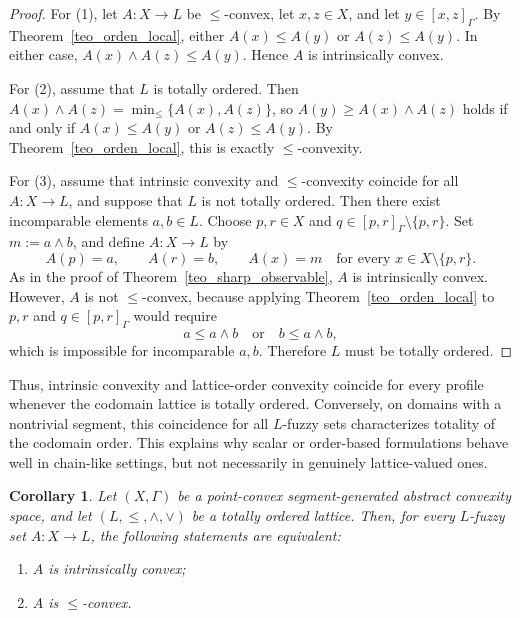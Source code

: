 \documentclass[11pt,a4paper]{article}
\newtheorem{corollary}{Corollary}
\begin{document}
\begin{proof}
For (1), let \(A:X\to L\) be \(\leq\)-convex, let \(x,z\in X\), and let \(y\in[x,z]_{\Gamma}\). By Theorem~\ref{teo_orden_local}, either \(A(x)\le A(y)\) or \(A(z)\le A(y)\). In either case, \(A(x)\wedge A(z)\le A(y)\). Hence \(A\) is intrinsically convex.

For (2), assume that \(L\) is totally ordered. Then \(A(x)\wedge A(z)=\min_{\le}\{A(x),A(z)\}\), so \(A(y)\ge A(x)\wedge A(z)\) holds if and only if \(A(x)\le A(y)\) or \(A(z)\le A(y)\). By Theorem~\ref{teo_orden_local}, this is exactly \(\leq\)-convexity.

For (3), assume that intrinsic convexity and \(\leq\)-convexity coincide for all \(A:X\to L\), and suppose that \(L\) is not totally ordered. Then there exist incomparable elements \(a,b\in L\). Choose \(p,r\in X\) and \(q\in[p,r]_{\Gamma}\setminus\{p,r\}\). Set \(m:=a\wedge b\), and define \(A:X\to L\) by
\begin{equation*}
A(p)=a,\qquad A(r)=b,\qquad A(x)=m\quad\text{for every }x\in X\setminus\{p,r\}.
\end{equation*}
As in the proof of Theorem~\ref{teo_sharp_observable}, \(A\) is intrinsically convex. However, \(A\) is not \(\leq\)-convex, because applying Theorem~\ref{teo_orden_local} to \(p,r\) and \(q\in[p,r]_{\Gamma}\) would require
\begin{equation*}
a\le a\wedge b
\quad\text{or}\quad
b\le a\wedge b,
\end{equation*}
which is impossible for incomparable \(a,b\). Therefore \(L\) must be totally ordered.
\end{proof}

Thus, intrinsic convexity and lattice-order convexity coincide for every profile whenever the codomain lattice is totally ordered. Conversely, on domains with a nontrivial segment, this coincidence for all \(L\)-fuzzy sets characterizes totality of the codomain order. This explains why scalar or order-based formulations behave well in chain-like settings, but not necessarily in genuinely lattice-valued ones.

\begin{corollary}\label{cororlario_lattice_order_total}
Let \((X,\Gamma)\) be a point-convex segment-generated abstract convexity space, and let \((L,\leq,\wedge,\vee)\) be a totally ordered lattice. Then, for every \(L\)-fuzzy set \(A:X\to L\), the following statements are equivalent:
\begin{enumerate}
    \item \(A\) is intrinsically convex;
    \item \(A\) is \(\leq\)-convex.
\end{enumerate}
\end{corollary}
\end{document}
